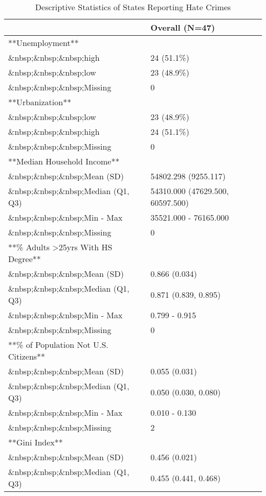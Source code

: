 \documentclass[
]{article}
\begin{document}
\begin{table}

\caption{\label{tab:unnamed-chunk-2}Descriptive Statistics of States Reporting Hate Crimes}
\centering
\begin{tabular}[t]{l|l}
\hline
 & Overall (N=47)\\
\hline
**Unemployment** & \\
\hline
\&nbsp;\&nbsp;\&nbsp;high & 24 (51.1\%)\\
\hline
\&nbsp;\&nbsp;\&nbsp;low & 23 (48.9\%)\\
\hline
\&nbsp;\&nbsp;\&nbsp;Missing & 0\\
\hline
**Urbanization** & \\
\hline
\&nbsp;\&nbsp;\&nbsp;low & 23 (48.9\%)\\
\hline
\&nbsp;\&nbsp;\&nbsp;high & 24 (51.1\%)\\
\hline
\&nbsp;\&nbsp;\&nbsp;Missing & 0\\
\hline
**Median Household Income** & \\
\hline
\&nbsp;\&nbsp;\&nbsp;Mean (SD) & 54802.298 (9255.117)\\
\hline
\&nbsp;\&nbsp;\&nbsp;Median (Q1, Q3) & 54310.000 (47629.500, 60597.500)\\
\hline
\&nbsp;\&nbsp;\&nbsp;Min - Max & 35521.000 - 76165.000\\
\hline
\&nbsp;\&nbsp;\&nbsp;Missing & 0\\
\hline
**\% Adults >25yrs With HS Degree** & \\
\hline
\&nbsp;\&nbsp;\&nbsp;Mean (SD) & 0.866 (0.034)\\
\hline
\&nbsp;\&nbsp;\&nbsp;Median (Q1, Q3) & 0.871 (0.839, 0.895)\\
\hline
\&nbsp;\&nbsp;\&nbsp;Min - Max & 0.799 - 0.915\\
\hline
\&nbsp;\&nbsp;\&nbsp;Missing & 0\\
\hline
**\% of Population Not U.S. Citizens** & \\
\hline
\&nbsp;\&nbsp;\&nbsp;Mean (SD) & 0.055 (0.031)\\
\hline
\&nbsp;\&nbsp;\&nbsp;Median (Q1, Q3) & 0.050 (0.030, 0.080)\\
\hline
\&nbsp;\&nbsp;\&nbsp;Min - Max & 0.010 - 0.130\\
\hline
\&nbsp;\&nbsp;\&nbsp;Missing & 2\\
\hline
**Gini Index** & \\
\hline
\&nbsp;\&nbsp;\&nbsp;Mean (SD) & 0.456 (0.021)\\
\hline
\&nbsp;\&nbsp;\&nbsp;Median (Q1, Q3) & 0.455 (0.441, 0.468)\\

\end{tabular}
\end{table}
\end{document}
